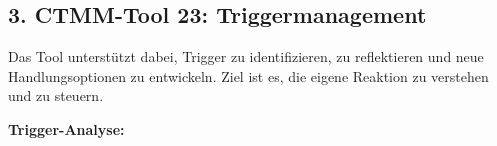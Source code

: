 \subsection*{\textcolor{ctmmOrange}{3. CTMM-Tool 23: Triggermanagement}}

Das Tool unterstützt dabei, Trigger zu identifizieren, zu reflektieren und neue Handlungsoptionen zu entwickeln. Ziel ist es, die eigene Reaktion zu verstehen und zu steuern.

\textbf{Trigger-Analyse:}\\
 \\
 \\
